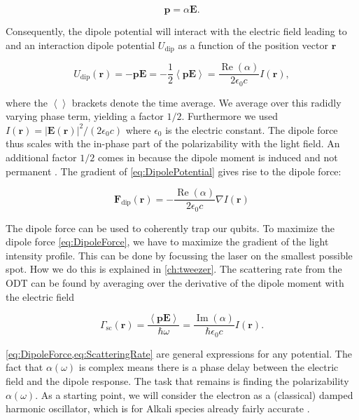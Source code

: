 \begin{equation}\label{eq:DipoleMoment}
	\mathbf{p} = \alpha \mathbf{E}.
\end{equation}

Consequently, the dipole potential will interact with the electric field leading to and an interaction dipole potential $U_{\text{dip}}$ as a function of the position vector $\mathbf{r}$ \cite{Grimm2000}

\begin{equation}\label{eq:DipolePotential}
	U_{\text{dip}}(\mathbf{r}) = -\mathbf{p}\mathbf{E} = 
	-\frac{1}{2} \left\langle \mathbf{p}\mathbf{E} \right\rangle = \frac{\operatorname{Re}(\alpha)}{2\epsilon_0 c} I(\mathbf{r}),
\end{equation}

where the $\left\langle\right\rangle$ brackets denote the time average. We average over this radidly varying phase term, yielding a factor $1/2$. Furthermore we used $I(\mathbf{r}) = |\mathbf{E}(\mathbf{r})|^2/(2\epsilon_0 c)$ where $\epsilon_0$ is the electric constant. The dipole force thus scales with the in-phase part of the polarizability with the light field. An additional factor $1/2$ comes in because the dipole moment is induced and not permanent \cite{Grimm2000}. The gradient of \cref{eq:DipolePotential} gives rise to the dipole force:

\begin{equation}\label{eq:DipoleForce}
	\mathbf{F}_{\text{dip}}(\mathbf{r}) = - \frac{\operatorname{Re}(\alpha)}{2\epsilon_0c}\nabla I(\mathbf{r})
\end{equation}

The dipole force can be used to coherently trap our qubits. To maximize the dipole force \cref{eq:DipoleForce}, we have to maximize the gradient of the light intensity profile. This can be done by focussing the laser on the smallest possible spot. How we do this is explained in \cref{ch:tweezer}. The scattering rate from the ODT can be found by averaging over the derivative of the dipole moment with the electric field \cite{Grimm2000}

\begin{equation}\label{eq:ScatteringRate}
	\Gamma_{\text{sc}}(\mathbf{r}) = \frac{\left\langle \mathbf{p} \mathbf{E} \right\rangle}{\hbar \omega}
	 = \frac{\operatorname{Im}(\alpha)}{\hbar \epsilon_0 c} I(\mathbf{r}).
\end{equation}

\cref{eq:DipoleForce,eq:ScatteringRate} are general expressions for any potential. The fact that $\alpha(\omega)$ is complex means there is a phase delay between the electric field and the dipole response. The task that remains is finding the polarizability $\alpha(\omega)$. As a starting point, we will consider the electron as a (classical) damped harmonic oscillator, which is for Alkali species already fairly accurate \cite{Grimm2000}.

